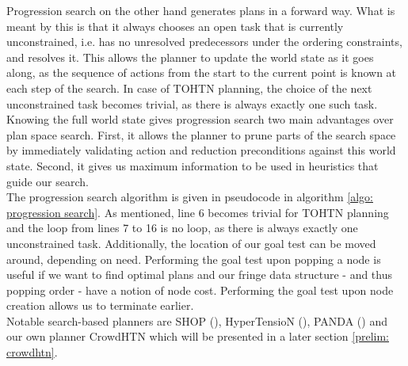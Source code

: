 Progression search on the other hand generates plans in a forward way. What is meant by this is that it always chooses an open task that is currently unconstrained, i.e. has no unresolved predecessors under the ordering constraints, and resolves it. This allows the planner to update the world state as it goes along, as the sequence of actions from the start to the current point is known at each step of the search. In case of TOHTN planning, the choice of the next unconstrained task becomes trivial, as there is always exactly one such task. Knowing the full world state gives progression search two main advantages over plan space search. First, it allows the planner to prune parts of the search space by immediately validating action and reduction preconditions against this world state. Second, it gives us maximum information to be used in heuristics that guide our search. \\
The progression search algorithm is given in pseudocode in algorithm \ref{algo: progression search}. As mentioned, line 6 becomes trivial for TOHTN planning and the loop from lines 7  to 16 is no loop, as there is always exactly one unconstrained task. Additionally, the location of our goal test can be moved around, depending on need. Performing the goal test upon popping a node is useful if we want to find optimal plans and our fringe data structure - and thus popping order - have a notion of node cost. Performing the goal test upon node creation allows us to terminate earlier. \\
Notable search-based planners are SHOP (\cite{nau1999shop}), HyperTensioN (\cite{magnaguagno2020hypertension}), PANDA (\cite{holler2020htn}) and our own planner CrowdHTN which will be presented in a later section \ref{prelim: crowdhtn}.
\begin{comment}
\cite{holler2020htn}
- progression search is one of the best known search algorithms
- generate plans in a forward way
- always resolve a task that has no more open predecessors with the ordering constraints (is called 'unconstrained task')
- own: for TOHTN: we always have exactly 1 task we want to process next!
- makes it trivial to find the next unconstrained task
- mentioned in the paper
- progression search planners always know the current (world) state, can use this information for heuristics, pruning etc

- other planners search partial plans but not in order, they thus cannot know the current world state
- perform goal test on popping: find optimal plan if popping order is informed by cost
- perform goal test before popping: explore fewer nodes

- Alford et al, 2012, Thm. 3 -> HTN problem is solvable <=> there is a solution in progression space

- parts of the search space will be searched more than once if no additional measures are taken
\end{comment}
